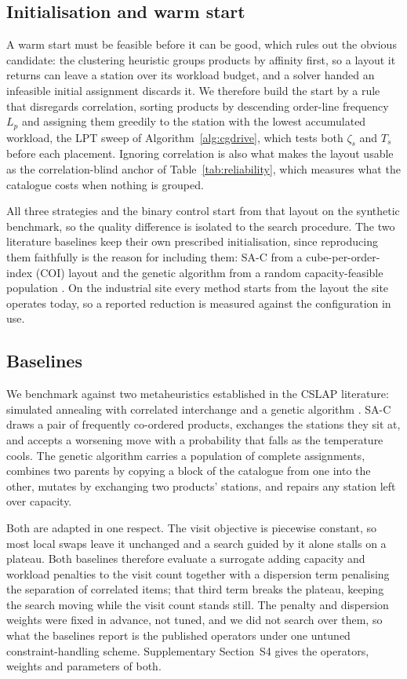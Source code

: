\documentclass[]{interact}
\begin{document}
\subsection{Initialisation and warm start}\label{sec:init}
A warm start must be feasible before it can be good, which rules out the obvious candidate: the clustering heuristic groups products by affinity first, so a layout it returns can leave a station over its workload budget, and a solver handed an infeasible initial assignment discards it. We therefore build the start by a rule that disregards correlation, sorting products by descending order-line frequency $L_p$ and assigning them greedily to the station with the lowest accumulated workload, the LPT sweep of Algorithm~\ref{alg:cgdrive}, which tests both $\zeta_s$ and $T_s$ before each placement. Ignoring correlation is also what makes the layout usable as the correlation-blind anchor of Table~\ref{tab:reliability}, which measures what the catalogue costs when nothing is grouped.

All three strategies and the binary control start from that layout on the synthetic benchmark, so the quality difference is isolated to the search procedure. The two literature baselines keep their own prescribed initialisation, since reproducing them faithfully is the reason for including them: SA-C from a cube-per-order-index (COI) layout \citep{kim2012} and the genetic algorithm from a random capacity-feasible population \citep{pan2015}. On the industrial site every method starts from the layout the site operates today, so a reported reduction is measured against the configuration in use.

\subsection{Baselines}\label{sec:baselines}
We benchmark against two metaheuristics established in the CSLAP literature: simulated annealing with correlated interchange \citep{kim2012, zhang2019cie} and a genetic algorithm \citep{pan2015}. SA-C draws a pair of frequently co-ordered products, exchanges the stations they sit at, and accepts a worsening move with a probability that falls as the temperature cools. The genetic algorithm carries a population of complete assignments, combines two parents by copying a block of the catalogue from one into the other, mutates by exchanging two products' stations, and repairs any station left over capacity.

Both are adapted in one respect. The visit objective is piecewise constant, so most local swaps leave it unchanged and a search guided by it alone stalls on a plateau. Both baselines therefore evaluate a surrogate adding capacity and workload penalties to the visit count together with a dispersion term penalising the separation of correlated items; that third term breaks the plateau, keeping the search moving while the visit count stands still. The penalty and dispersion weights were fixed in advance, not tuned, and we did not search over them, so what the baselines report is the published operators under one untuned constraint-handling scheme. Supplementary Section~S4 gives the operators, weights and parameters of both.
\end{document}
